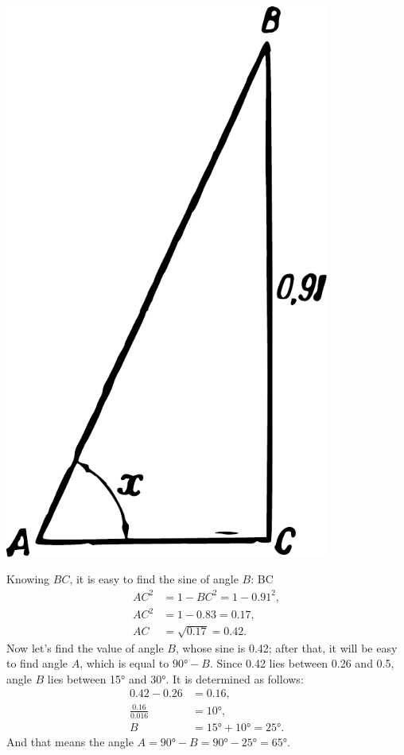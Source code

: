\begin{marginfigure}%
\centering
\includegraphics[width=0.8\textwidth]{figures/ch-05/fig-091.pdf}
\end{marginfigure}

Knowing $BC$, it is easy to find the sine of angle $B$: BC
\begin{align*}%
AC^{2} & = 1 - BC^{2} = 1 - 0.91^{2},\\
AC^{2} &  = 1 - 0.83 = 0.17,\\
AC & = \sqrt{0.17} = 0.42.
\end{align*}
Now let's find the value of angle $B$, whose sine is 0.42; after that, it will be easy to find angle $A$, which is equal to $\ang{90}  - B$. Since 0.42 lies between 0.26 and 0.5, angle $B$ lies between \ang{15} and \ang{30}. It is determined as follows:
\begin{align*}
0.42 - 0.26 & = 0.16, \\
\frac{0.16}{0.016} & = \ang{10},\\
B & = \ang{15} + \ang{10} = \ang{25}.
\end{align*}
And that means the angle $A = \ang{90} - B = \ang{90} - \ang{25} = \ang{65}.$

